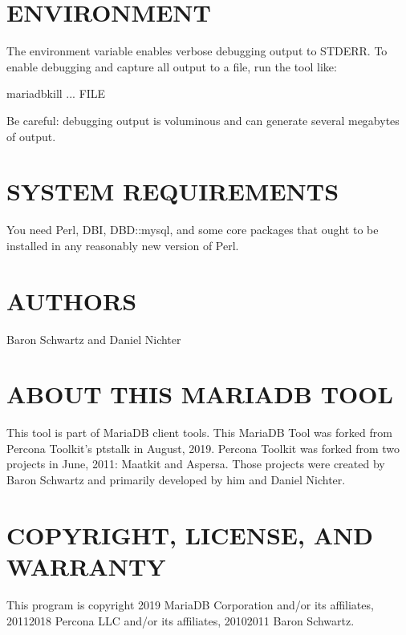 \documentclass[letterpaper,10pt,english]{sphinxmanual}
\begin{document}
\section{ENVIRONMENT}
\label{\detokenize{mariadb-kill:environment}}
\sphinxAtStartPar
The environment variable  enables verbose debugging output to STDERR.
To enable debugging and capture all output to a file, run the tool like:

\begin{sphinxVerbatim}[commandchars=\\\{\}]
 mariadb\PYGZhy{}kill ... \PYGZgt{} FILE \PYGZgt{}
\end{sphinxVerbatim}

\sphinxAtStartPar
Be careful: debugging output is voluminous and can generate several megabytes
of output.


\section{SYSTEM REQUIREMENTS}
\label{\detokenize{mariadb-kill:system-requirements}}
\sphinxAtStartPar
You need Perl, DBI, DBD::mysql, and some core packages that ought to be
installed in any reasonably new version of Perl.


\section{AUTHORS}
\label{\detokenize{mariadb-kill:authors}}
\sphinxAtStartPar
Baron Schwartz and Daniel Nichter


\section{ABOUT THIS MARIADB TOOL}
\label{\detokenize{mariadb-kill:about-this-mariadb-tool}}
\sphinxAtStartPar
This tool is part of MariaDB client tools. This MariaDB Tool was forked from
Percona Toolkit’s pt\sphinxhyphen{}stalk in August, 2019. Percona Toolkit was forked from two
projects in June, 2011: Maatkit and Aspersa.  Those projects were created by
Baron Schwartz and primarily developed by him and Daniel Nichter.


\section{COPYRIGHT, LICENSE, AND WARRANTY}
\label{\detokenize{mariadb-kill:copyright-license-and-warranty}}
\sphinxAtStartPar
This program is copyright 2019 MariaDB Corporation and/or its affiliates,
2011\sphinxhyphen{}2018 Percona LLC and/or its affiliates, 2010\sphinxhyphen{}2011 Baron Schwartz.
\end{document}
